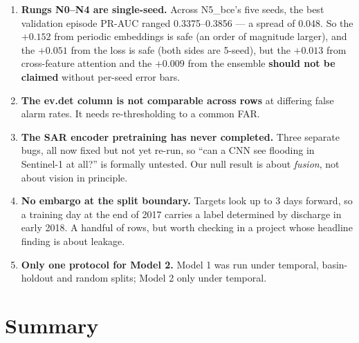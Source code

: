 \documentclass[11pt,a4paper]{article}
\begin{document}
\begin{enumerate}[leftmargin=*]
\item \textbf{Rungs N0--N4 are single-seed.} Across N5\_bce's five seeds, the
best validation episode PR-AUC ranged 0.3375--0.3856 --- a spread of 0.048. So
the $+0.152$ from periodic embeddings is safe (an order of magnitude larger), and
the $+0.051$ from the loss is safe (both sides are 5-seed), but the $+0.013$ from
cross-feature attention and the $+0.009$ from the ensemble \textbf{should not be
claimed} without per-seed error bars.

\item \textbf{The ev.det column is not comparable across rows} at differing false
alarm rates. It needs re-thresholding to a common FAR.

\item \textbf{The SAR encoder pretraining has never completed.} Three separate
bugs, all now fixed but not yet re-run, so ``can a CNN see flooding in Sentinel-1
at all?'' is formally untested. Our null result is about \emph{fusion}, not about
vision in principle.

\item \textbf{No embargo at the split boundary.} Targets look up to 3 days
forward, so a training day at the end of 2017 carries a label determined by
discharge in early 2018. A handful of rows, but worth checking in a project whose
headline finding is about leakage.

\item \textbf{Only one protocol for Model 2.} Model 1 was run under temporal,
basin-holdout and random splits; Model 2 only under temporal.
\end{enumerate}

\section{Summary}
\end{document}
